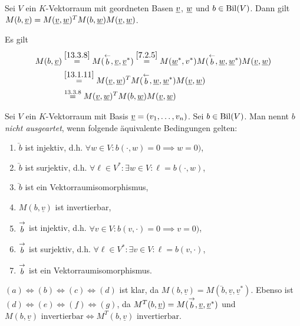 \documentclass[../../main.tex]{subfiles}
\begin{document}
\begin{sat}\label{13.3.10}
	Sei $V$ ein $K$-Vektorraum mit geordneten Basen ${\underline v}$, ${\underline w}$ und $b\in \operatorname{Bil}(V)$. Dann gilt $M(b,{\underline v})=M({\underline v},{\underline w})^TM(b,{\underline w})M({\underline v},{\underline w})$.
\end{sat}
\begin{cproof} Es gilt
	\begin{align*}
		M(b,{\underline v})&\stackrel{\ref{13.3.8}}{=}M(\stackrel{\leftarrow}{b}, {\underline v},{\underline v}^*)\stackrel{\ref{7.2.5}}{=}M({\underline w}^*,v^*)M(\stackrel{\leftarrow}{b},{\underline w},{\underline w}^*)M({\underline v},{\underline w})\\
		&\stackrel{\ref{13.1.11}}{=}M({\underline v},{\underline w})^TM(\stackrel{\leftarrow}{b},{\underline w},{\underline w}^*)M({\underline v},{\underline w})\\
		&\stackrel{13.3.8}{=}M({\underline v},{\underline w})^TM(b,{\underline w})M({\underline v},{\underline w})
	\end{align*}
\end{cproof}

\begin{defprop}\label{13.3.11}
	Sei $V$ ein $K$-Vektorraum mit Basis ${\underline v}=(v_1,\ldots ,v_n)$. Sei $b\in \operatorname{Bil}(V)$. Man nennt $b$ \emph{nicht ausgeartet}, wenn folgende äquivalente Bedingungen gelten:
	\begin{enumerate}[\normalfont(a)]
		\item $\lvec b$ ist injektiv, d.h. $\forall w\in V: b(\cdot, w)=0\implies w=0)$,
		\item $\lvec b$ ist surjektiv, d.h. $\forall \ell\in V^*: \exists w\in V: \ell=b(\cdot,w)$,
		\item $\lvec b$ ist ein Vektorraumisomorphismus,
		\item $M(b,\underline{v})$ ist invertierbar,
		\item $\stackrel{\rightarrow}{b}$ ist injektiv, d.h. $\forall v\in V: b(v, \cdot)=0\implies v=0)$,
		\item $\stackrel{\rightarrow}{b}$ ist surjektiv, d.h. $\forall \ell\in V^*: \exists v\in V: \ell=b(v,\cdot)$,
		\item $\stackrel{\rightarrow}{b}$ ist ein Vektorraumisomorphismus.
	\end{enumerate}
\end{defprop}
\begin{cproof}
	$(a)\Longleftrightarrow(b)\Longleftrightarrow(c)\Longleftrightarrow(d)$ ist klar, da $M(b,\underline{v})=M(\lvec b,\underline{v},\underline{v}^*)$. Ebenso ist $(d)\Longleftrightarrow(e)\Longleftrightarrow(f)\Longleftrightarrow(g)$, da $M^T(b,\underline{v})=M(\stackrel{\rightarrow}{b},\underline{v},\underline{v}^*)$ und $M(b,\underline{v})\text{ invertierbar}\Longleftrightarrow M^T(b,\underline{v})\text{ invertierbar}$.
\end{cproof}
\end{document}
